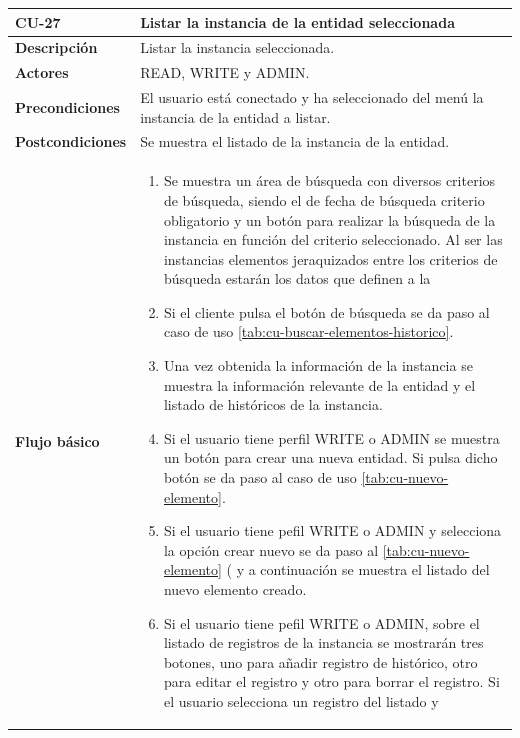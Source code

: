 \begin{table} [H]
    \centering
    \setlength{\leftmargini}{0.4cm}
	\resizebox{15cm}{!} { %
    \begin{tabular}{| m{3cm} | m{12cm} |}   
    \hline
	  \textbf{CU-27} & \textbf{Listar la instancia de la entidad seleccionada} \\\hline
	  \textbf{Descripción} & Listar la instancia seleccionada. \\\hline
	  \textbf{Actores} & READ, WRITE y ADMIN. \\\hline
	  \textbf{Precondiciones} & El usuario está conectado y ha seleccionado del menú la instancia de la entidad a listar. \\\hline
	  \textbf{Postcondiciones} & Se muestra el listado de la instancia de la entidad. \\\hline
	  \textbf{Flujo básico} & 
		\begin{enumerate}
	  	\item Se muestra un área de búsqueda con diversos criterios de búsqueda, siendo el de fecha de búsqueda criterio obligatorio y un botón para realizar la búsqueda de la instancia en función del criterio seleccionado. Al ser las instancias elementos jeraquizados entre los criterios de búsqueda estarán los datos que definen a la 
	  	\item Si el cliente pulsa el botón de búsqueda se da paso al caso de uso \ref{tab:cu-buscar-elementos-historico}. 
	  	\item Una vez obtenida la información de la instancia se muestra la información relevante de la entidad y el listado de históricos de la instancia.
	  	\item Si el usuario tiene perfil WRITE o ADMIN se muestra un botón para crear una nueva entidad. Si pulsa dicho botón se da paso al caso de uso \ref{tab:cu-nuevo-elemento}.
	  	\item Si el usuario tiene pefil WRITE o ADMIN y selecciona la opción crear nuevo se da paso al \ref{tab:cu-nuevo-elemento} (\pageref{tab:cu-nuevo-elemento} y a continuación se muestra el listado del nuevo elemento creado.
		\item Si el usuario tiene pefil WRITE o ADMIN, sobre el listado de registros de la instancia se mostrarán tres botones, uno para añadir registro de histórico, otro para editar el registro y otro para borrar el registro. Si el usuario selecciona un registro del listado y
		    \begin{enumerate}

\end{enumerate}
\end{enumerate}
\end{tabular}}
\end{table}
